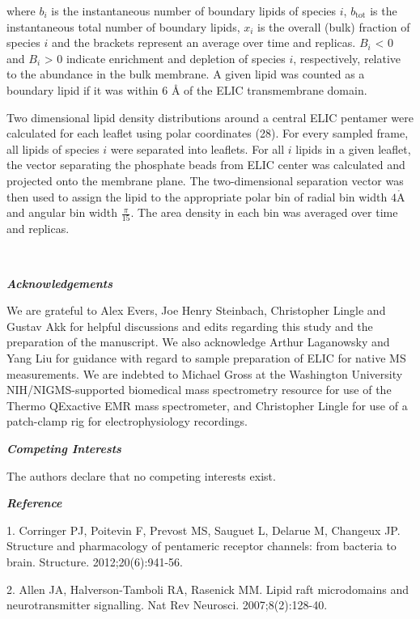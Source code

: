 where \(b_{i}\) is the instantaneous number of boundary lipids of
species \(i\), \(b_{\text{tot}}\) is the instantaneous total number of
boundary lipids, \(x_{i}\) is the overall (bulk) fraction of species
\(i\) and the brackets represent an average over time and replicas.
\(B_{i}\) \textless{} 0 and \(B_{i}\) \textgreater{} 0 indicate
enrichment and depletion of species \(i\), respectively, relative to the
abundance in the bulk membrane. A given lipid was counted as a boundary
lipid if it was within 6 Å of the ELIC transmembrane domain.

Two dimensional lipid density distributions around a central ELIC
pentamer were calculated for each leaflet using polar coordinates (28).
For every sampled frame, all lipids of species \(i\) were separated into
leaflets. For all \(i\) lipids in a given leaflet, the vector separating
the phosphate beads from ELIC center was calculated and projected onto
the membrane plane. The two-dimensional separation vector was then used
to assign the lipid to the appropriate polar bin of radial bin width
\(4\mathring{\mathrm{A}}\) and angular bin width
\(\frac{\pi}{15}\text{.\ }\)The area density in each bin was averaged
over time and replicas.

\textbf{\emph{\\
}}

\textbf{\emph{Acknowledgements}}

We are grateful to Alex Evers, Joe Henry Steinbach, Christopher Lingle
and Gustav Akk for helpful discussions and edits regarding this study
and the preparation of the manuscript. We also acknowledge Arthur
Laganowsky and Yang Liu for guidance with regard to sample preparation
of ELIC for native MS measurements. We are indebted to Michael Gross at
the Washington University NIH/NIGMS-supported biomedical mass
spectrometry resource for use of the Thermo QExactive EMR mass
spectrometer, and Christopher Lingle for use of a patch-clamp rig for
electrophysiology recordings.

\textbf{\emph{Competing Interests}}

The authors declare that no competing interests exist.

\textbf{\emph{Reference}}

1. Corringer PJ, Poitevin F, Prevost MS, Sauguet L, Delarue M, Changeux
JP. Structure and pharmacology of pentameric receptor channels: from
bacteria to brain. Structure. 2012;20(6):941-56.

2. Allen JA, Halverson-Tamboli RA, Rasenick MM. Lipid raft microdomains
and neurotransmitter signalling. Nat Rev Neurosci. 2007;8(2):128-40.

